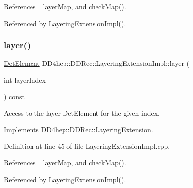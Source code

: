 References \+\_\+layer\+Map, and check\+Map().



Referenced by Layering\+Extension\+Impl().

\hypertarget{class_d_d4hep_1_1_d_d_rec_1_1_layering_extension_impl_a8bedbd77b80001351451a8cf3bba6a5c}{}\label{class_d_d4hep_1_1_d_d_rec_1_1_layering_extension_impl_a8bedbd77b80001351451a8cf3bba6a5c} 
\subsubsection{\texorpdfstring{layer()}{layer()}}
{\footnotesize\ttfamily \hyperlink{class_d_d4hep_1_1_geometry_1_1_det_element}{Det\+Element} D\+D4hep\+::\+D\+D\+Rec\+::\+Layering\+Extension\+Impl\+::layer (\begin{DoxyParamCaption}\item[{int}]{layer\+Index }\end{DoxyParamCaption}) const\hspace{0.3cm}{\ttfamily [virtual]}}



Access to the layer Det\+Element for the given index. 



Implements \hyperlink{class_d_d4hep_1_1_d_d_rec_1_1_layering_extension_a080be80c3277feaa59828b829d29c747}{D\+D4hep\+::\+D\+D\+Rec\+::\+Layering\+Extension}.



Definition at line 45 of file Layering\+Extension\+Impl.\+cpp.



References \+\_\+layer\+Map, and check\+Map().



Referenced by Layering\+Extension\+Impl().

\hypertarget{class_d_d4hep_1_1_d_d_rec_1_1_layering_extension_impl_aa0489a7a78bd134ff3ecdf2509c3c1c0}{}\label{class_d_d4hep_1_1_d_d_rec_1_1_layering_extension_impl_aa0489a7a78bd134ff3ecdf2509c3c1c0} 
